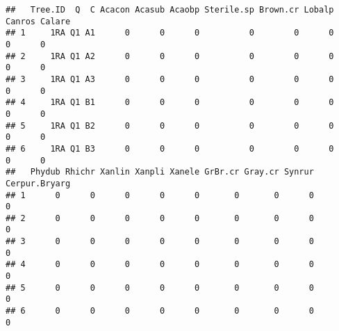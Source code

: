\documentclass[]{article}
\begin{document}
\begin{verbatim}
##   Tree.ID  Q  C Acacon Acasub Acaobp Sterile.sp Brown.cr Lobalp Canros Calare
## 1     1RA Q1 A1      0      0      0          0        0      0      0      0
## 2     1RA Q1 A2      0      0      0          0        0      0      0      0
## 3     1RA Q1 A3      0      0      0          0        0      0      0      0
## 4     1RA Q1 B1      0      0      0          0        0      0      0      0
## 5     1RA Q1 B2      0      0      0          0        0      0      0      0
## 6     1RA Q1 B3      0      0      0          0        0      0      0      0
##   Phydub Rhichr Xanlin Xanpli Xanele GrBr.cr Gray.cr Synrur Cerpur.Bryarg
## 1      0      0      0      0      0       0       0      0             0
## 2      0      0      0      0      0       0       0      0             0
## 3      0      0      0      0      0       0       0      0             0
## 4      0      0      0      0      0       0       0      0             0
## 5      0      0      0      0      0       0       0      0             0
## 6      0      0      0      0      0       0       0      0             0
\end{verbatim}
\end{document}
